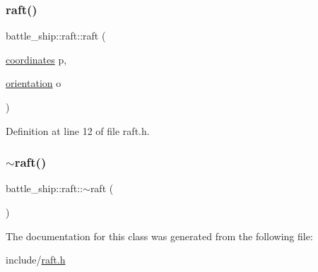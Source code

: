 \subsubsection{\texorpdfstring{raft()}{raft()}\hspace{0.1cm}{\footnotesize\ttfamily [2/2]}}
{\footnotesize\ttfamily battle\+\_\+ship\+::raft\+::raft (\begin{DoxyParamCaption}\item[{\hyperlink{structbattle__ship_1_1coordinates}{coordinates}}]{p,  }\item[{\hyperlink{namespacebattle__ship_aed87488f0a73f0d0679fe343fb61c784}{orientation}}]{o }\end{DoxyParamCaption})\hspace{0.3cm}{\ttfamily [inline]}}



Definition at line 12 of file raft.\+h.

\mbox{\label{classbattle__ship_1_1raft_a4b381ef568f95e3fe097eeef75d2ac51}} 
\subsubsection{\texorpdfstring{$\sim$raft()}{~raft()}}
{\footnotesize\ttfamily battle\+\_\+ship\+::raft\+::$\sim$raft (\begin{DoxyParamCaption}{ }\end{DoxyParamCaption})\hspace{0.3cm}{\ttfamily [default]}}



The documentation for this class was generated from the following file\+:\begin{DoxyCompactItemize}
\item 
include/\hyperlink{raft_8h}{raft.\+h}\end{DoxyCompactItemize}
